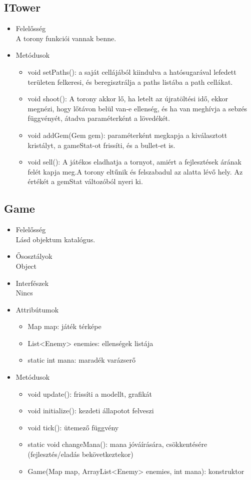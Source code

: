 \subsection{ITower}
\begin{itemize}
\item Felelősség\\
A torony funkciói vannak benne.
\item Metódusok
	\begin{itemize}
		\item void setPaths(): a saját cellájából kiindulva a hatósugarával lefedett területen felkeresi, és beregisztrálja a paths listába a path cellákat.
		\item void shoot(): A torony akkor lő, ha letelt az újratöltési idő, ekkor megnézi, hogy lőtávon belül van-e ellenség, és ha van meghívja a sebzés függvényét, átadva paraméterként a lövedékét. 
		\item void addGem(Gem gem): paraméterként megkapja a kiválasztott kristályt, a gameStat-ot frissíti, és a bullet-et is.
		\item void sell(): A játékos eladhatja a tornyot, amiért a fejlesztések árának felét kapja meg.A torony eltűnik és felszabadul az alatta lévő hely. Az értékét a gemStat változóból 	nyeri ki.
		
		
	\end{itemize}
\end{itemize}

\subsection{Game}
\begin{itemize}
\item Felelősség\\
Lásd objektum katalógus.
\item Ősosztályok\\
Object
\item Interfészek\\
Nincs
\item Attribútumok
	\begin{itemize}
		\item Map map: játék térképe
		\item List<Enemy> enemies: ellenségek listája
		\item static int mana: maradék varázserő


		
	\end{itemize}
\item Metódusok
	\begin{itemize}
		\item void update(): frissíti a modellt, grafikát
		\item void initialize(): kezdeti állapotot felveszi
		\item void tick(): ütemező függvény
		\item static void changeMana(): mana jóváírására, csökkentésére (fejlesztés/eladás bekövetkeztekor)
		\item Game(Map map, ArrayList<Enemy> enemies, int mana): konstruktor
		
		
	\end{itemize}
\end{itemize}
